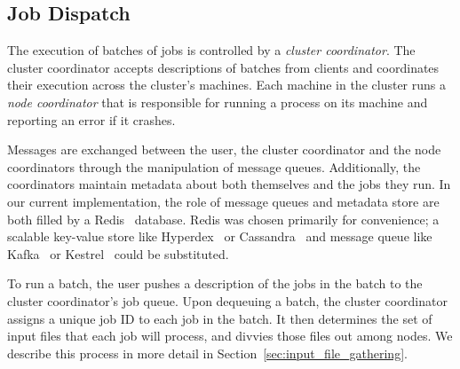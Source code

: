 \subsection{Job Dispatch}
\label{sec:control_plane}

The execution of batches of jobs is controlled by a \emph{cluster
  coordinator}. The cluster coordinator accepts descriptions of batches from
clients and coordinates their execution across the cluster's machines. Each
machine in the cluster runs a \emph{node coordinator} that is responsible for
running a \themis process on its machine and reporting an error if it crashes.

Messages are exchanged between the user, the cluster coordinator and the node
coordinators through the manipulation of message queues. Additionally, the
coordinators maintain metadata about both themselves and the jobs they run. In
our current implementation, the role of message queues and metadata store are
both filled by a Redis~\cite{redis} database. Redis was chosen primarily for
convenience; a scalable key-value store like Hyperdex~\cite{hyperdex} or
Cassandra~\cite{cassandra} and message queue like Kafka~\cite{kafka} or
Kestrel~\cite{kestrel} could be substituted.

To run a batch, the user pushes a description of the jobs in the batch to the
cluster coordinator's job queue. Upon dequeuing a batch, the cluster
coordinator assigns a unique job ID to each job in the batch. It then determines
the set of input files that each job will process, and divvies those files out
among nodes. We describe this process in more detail in
Section~\ref{sec:input_file_gathering}.
